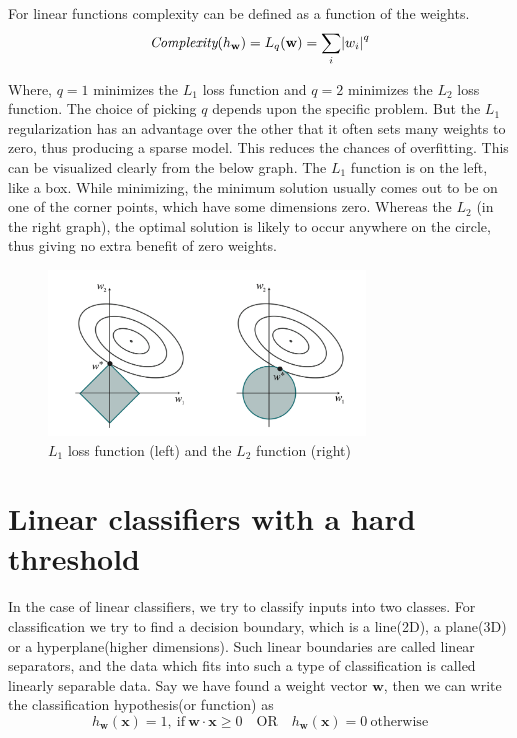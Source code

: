 \documentclass{article}
\begin{document}
    For linear functions complexity can be defined as a function of the weights.
    \begin{equation*}
      \emph{Complexity} (h_{\mathbf{w}}) = L_q (\mathbf{w}) = \sum_{i} \abs{w_i}^q
    \end{equation*}

    Where, $q=1$ minimizes the $L_1$ loss function and $q=2$ minimizes the $L_2$ loss function. The choice of picking $q$ depends upon the specific problem. But the $L_1$ regularization has an advantage over the other that it often sets many weights to zero, thus producing a sparse model. This reduces the chances of overfitting. This can be visualized clearly from the below graph. The $L_1$ function is on the left, like a box. While minimizing, the minimum solution usually comes out to be on one of the corner points, which have some dimensions zero. Whereas the $L_2$ (in the right graph), the optimal solution is likely to occur anywhere on the circle, thus giving no extra benefit of zero weights.

    \begin{figure}[H]
      \centering
      \includegraphics[width=0.75\textwidth]{ss.png}
      \caption{$L_1$ loss function (left) and the $L_2$ function (right)}
   \end{figure}

\section*{Linear classifiers with a hard threshold}
   \paragraph{}
    In the case of linear classifiers, we try to classify inputs into two classes. For classification we try to find a decision boundary, which is a line(2D), a plane(3D) or a hyperplane(higher dimensions). Such linear boundaries are called linear separators, and the data which fits into such a type of classification is called linearly separable data. Say we have found a weight vector $\mathbf{w}$, then we can write the classification hypothesis(or function) as
    \begin{equation*}
      h_{\mathbf{w}}(\mathbf{x}) = 1 , \:  \text{if} \: \mathbf{w} \cdot \mathbf{x} \geq 0 \quad \text{OR} \quad h_{\mathbf{w}}(\mathbf{x}) = 0 \: \text{otherwise}
    \end{equation*}
\end{document}
